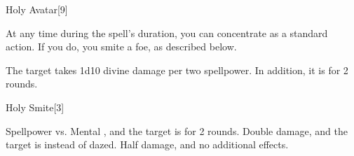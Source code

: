 \begin{spellsection}{Holy Avatar}[9]
    \begin{spellheader}
    \end{spellheader}
    \begin{spellcontent}
        \begin{spelltargetinginfo}
        \end{spelltargetinginfo}
        \begin{spelleffects}
            \spelleffect At any time during the spell's duration, you can concentrate as a standard action. If you do, you smite a foe, as described below.
            \spelldur \durlong
        \end{spelleffects}
    \end{spellcontent}
    \begin{spellsubcontent}
        \begin{spelltargetinginfo}
        \end{spelltargetinginfo}
        \begin{spelleffects}
            \spelleffect The target takes 1d10 divine damage per two spellpower. In addition, it is \dazed for 2 rounds.
        \end{spelleffects}
    \end{spellsubcontent}
    \begin{spellfooter}
        \miscastexplode
    \end{spellfooter}
\end{spellsection}

\begin{spellsection}{Holy Smite}[3]
    \begin{spellheader}
    \end{spellheader}
    \begin{spellcontent}
        \begin{spelltargetinginfo}
        \end{spelltargetinginfo}
        \begin{spelleffects}
            \begin{spellattack}{Spellpower vs. Mental}
                \spellsuccess {}, and the target is \dazed for 2 rounds.
                \spellcritical Double damage, and the target is \stunned instead of dazed.
                \spellfailure Half damage, and no additional effects.
            \end{spellattack}
        \end{spelleffects}
    \end{spellcontent}
    \begin{spellfooter}
        \miscastrandom
    \end{spellfooter}
\end{spellsection}

